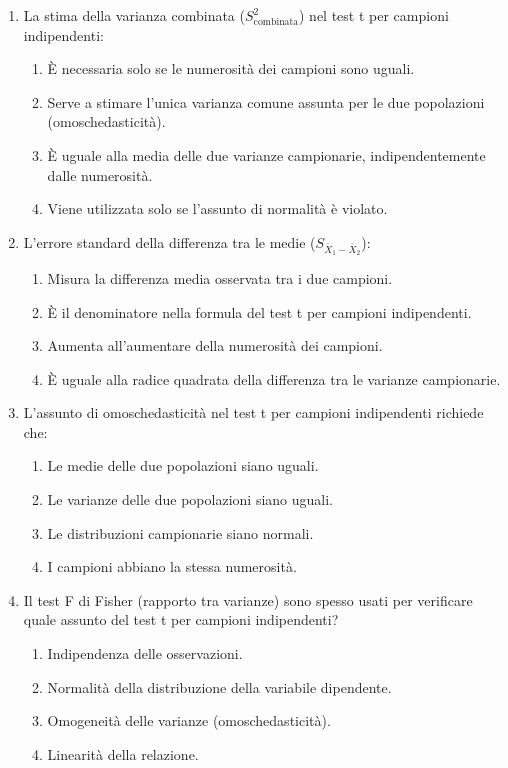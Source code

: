 \documentclass[12pt, a4paper]{article}
\newcommand{\samplemean}{\bar{X}} %
\newcommand{\Spool}{S^2_{\text{combinata}}} %
\begin{document}
\begin{enumerate}
    \item La stima della varianza combinata ($\Spool$) nel test t per campioni indipendenti:
    \begin{enumerate}
        \item È necessaria solo se le numerosità dei campioni sono uguali.
        \item Serve a stimare l'unica varianza comune assunta per le due popolazioni (omoschedasticità).
        \item È uguale alla media delle due varianze campionarie, indipendentemente dalle numerosità.
        \item Viene utilizzata solo se l'assunto di normalità è violato.
    \end{enumerate}

    \item L'errore standard della differenza tra le medie ($S_{\samplemean_1 - \samplemean_2}$):
    \begin{enumerate}
        \item Misura la differenza media osservata tra i due campioni.
        \item È il denominatore nella formula del test t per campioni indipendenti.
        \item Aumenta all'aumentare della numerosità dei campioni.
        \item È uguale alla radice quadrata della differenza tra le varianze campionarie.
    \end{enumerate}

    \item L'assunto di omoschedasticità nel test t per campioni indipendenti richiede che:
    \begin{enumerate}
        \item Le medie delle due popolazioni siano uguali.
        \item Le varianze delle due popolazioni siano uguali.
        \item Le distribuzioni campionarie siano normali.
        \item I campioni abbiano la stessa numerosità.
    \end{enumerate}

    \item Il test F di Fisher (rapporto tra varianze) sono spesso usati per verificare quale assunto del test t per campioni indipendenti?
    \begin{enumerate}
        \item Indipendenza delle osservazioni.
        \item Normalità della distribuzione della variabile dipendente.
        \item Omogeneità delle varianze (omoschedasticità).
        \item Linearità della relazione.
    \end{enumerate}


\end{enumerate}
\end{document}
